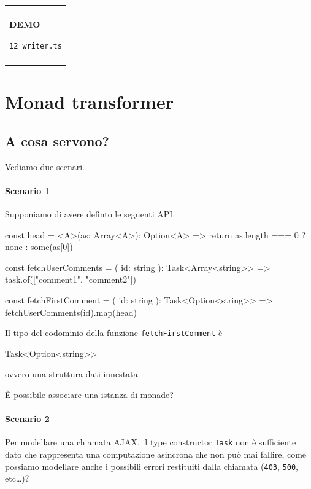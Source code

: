 \documentclass[12pt]{article}
\theoremstyle{definition}
\newenvironment{demo}
    {\begin{center}
    \begin{tabular}{|p{0.9\textwidth}|}
    \hline\\
    }
    {
    \\\\\hline
    \end{tabular}
    \end{center}
    }
\newenvironment{code}
  {\vspace{0.5cm} \VerbatimEnvironment\begin{typescriptcode}}
  {\end{typescriptcode} \vspace{0.2cm}}
\begin{document}
\begin{demo}
\begin{center}
\textbf{DEMO}

\texttt{12\_writer.ts}
\end{center}
\end{demo}

\newpage

\section{Monad transformer}

\subsection{A cosa servono?}

Vediamo due scenari.

\paragraph{Scenario 1}

Supponiamo di avere definto le seguenti API

\begin{code}
const head = <A>(as: Array<A>): Option<A> => {
  return as.length === 0 ? none : some(as[0])
}

const fetchUserComments = (
  id: string
): Task<Array<string>> => task.of(["comment1", "comment2"])

const fetchFirstComment = (
  id: string
): Task<Option<string>> => fetchUserComments(id).map(head)
\end{code}

Il tipo del codominio della funzione \texttt{fetchFirstComment} è

\begin{code}
Task<Option<string>>
\end{code}

ovvero una struttura dati innestata.

È possibile associare una istanza di monade?

\paragraph{Scenario 2}

Per modellare una chiamata AJAX, il type constructor \texttt{Task} non è sufficiente dato che rappresenta una computazione
asincrona che non può mai fallire, come possiamo modellare anche i possibili errori restituiti dalla chiamata (\texttt{403}, \texttt{500}, etc\ldots)?
\end{document}

